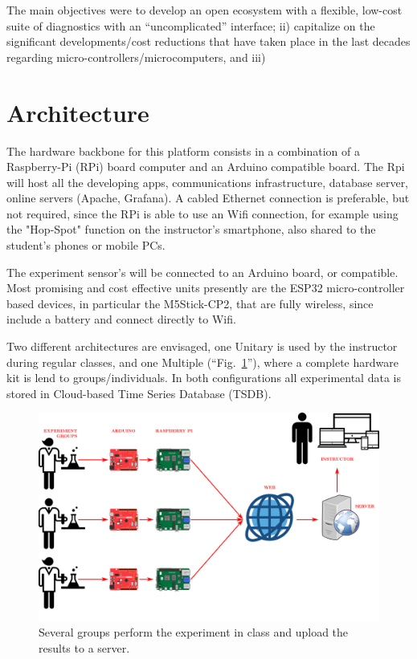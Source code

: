 \documentclass[conference]{IEEEtran}
\begin{document}
The main objectives were to develop an open ecosystem with a flexible, low-cost suite of diagnostics with an ``uncomplicated'' interface; ii) capitalize on the significant developments/cost reductions that have taken place in the last decades regarding micro-controllers/microcomputers, and iii)

\section{Architecture}
The hardware backbone for this platform consists in a combination of a Raspberry-Pi (RPi) board computer and an Arduino compatible board. 
The Rpi will host all the developing  apps, communications infrastructure, database server, online servers (Apache, Grafana). 
 A cabled Ethernet connection is preferable, but not  required, since the RPi is able to use an Wifi connection, 
 for example using the "Hop-Spot" function on the instructor’s smartphone, also shared to the student’s phones or mobile PCs.

 The experiment sensor's will be connected to an Arduino board, or compatible.
 Most promising and cost effective units presently are the ESP32 micro-controller based devices, in particular the M5Stick-CP2,
 that are fully wireless, since include a battery and connect directly to Wifi.

 Two different architectures are envisaged, one Unitary is used by the instructor during regular classes, 
 and one Multiple (``Fig.~\ref{figMultiple}''),
 where a complete hardware kit is lend to groups/individuals. 
 In both configurations all experimental data is stored in Cloud-based Time Series Database\cite{b3} (TSDB).
 
\begin{figure}[htbp]
\centerline{\includegraphics[width=.6\columnwidth]{Multiple.png}}
\caption{Several groups perform the experiment in class and upload the results to a server.}
\label{figMultiple}
\end{figure}
\end{document}

